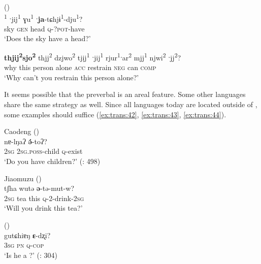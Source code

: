 \ea%
    \label{ex:trans:41}
    \ea
     ()\\
    \textsuperscript{1} {ˑ}{jij}\textsuperscript{1} {ɣu}\textsuperscript{1} \textbf{{ˑ}}\textbf{{ja}}{-tɕhjɨ}\textsuperscript{1}{-dju}\textsuperscript{1}?\\
    sky  \textsc{gen}  head  \textsc{q}-?\textsc{pot}-have\\
    \glt ‘Does the sky have a head?’ \citep[427]{Jacques2011}
    
    \ex
    \gll \textbf{{thjij}}\textbf{\textsuperscript{2}}\textbf{{sjo}}\textbf{\textsuperscript{2}} {thjj}\textsuperscript{2} {dzjwo}\textsuperscript{2} {tjịj}\textsuperscript{1} ˑ{jij}\textsuperscript{1} {rjur}\textsuperscript{1}ˑ{ar}\textsuperscript{2} {mjj}\textsuperscript{1} {njwi}\textsuperscript{2} ˑ{jj}\textsuperscript{2}?\\
    why    this  person  alone  \textsc{acc}  restrain    \textsc{neg}  can \textsc{comp}\\
    \glt ‘Why can’t you restrain this person alone?’ \citep[614]{Gong2003}
    \z
    \z

It seems possible that the preverbal  is an areal feature. Some other  languages share the same  strategy as well. Since all  languages today are located outside of , some examples should suffice (\ref{ex:trans:42}, \ref{ex:trans:43}, \ref{ex:trans:44}).

\ea%
    \label{ex:trans:42}
    Caodeng  ()\\
     {nɐ-lŋaʔ} \textbf{\'{ə}}-toʔ?\\
    2\textsc{sg}  2\textsc{sg.poss}-child  \textsc{q}-exist\\
    \glt ‘Do you have children?’ (\citealt{Sun2003b}: 498)
    \z

\ea%
    \label{ex:trans:43}
    Jiaomuzu  ()\\
     {tʃha} {wutə} \textbf{{ə}}-tə-mut-w?\\
    2\textsc{sg}  tea  this  \textsc{q}-2-drink-2\textsc{sg}\\
    \glt ‘Will you drink this tea?’ \citep[593]{Prins2017}
    \z

\ea%
    \label{ex:trans:44}
     ()\\
     {gutɕhiɐŋ} \textbf{{ɛ}}-{dʐi?}\\
    3\textsc{sg}  \textsc{pn}    \textsc{q}-\textsc{cop}\\
    \glt ‘Is he a ?’ (\citealt{Jiang2015}: 304)
    \z

